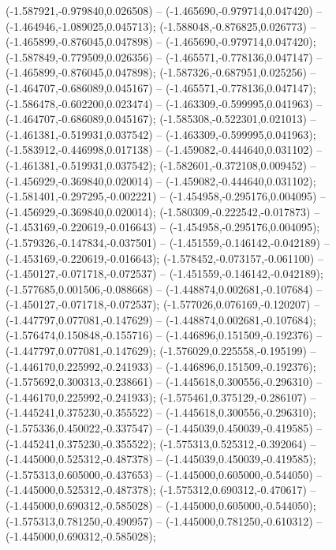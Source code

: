  (-1.587921,-0.979840,0.026508) -- (-1.465690,-0.979714,0.047420) -- (-1.464946,-1.089025,0.045713);
 (-1.588048,-0.876825,0.026773) -- (-1.465899,-0.876045,0.047898) -- (-1.465690,-0.979714,0.047420);
 (-1.587849,-0.779509,0.026356) -- (-1.465571,-0.778136,0.047147) -- (-1.465899,-0.876045,0.047898);
 (-1.587326,-0.687951,0.025256) -- (-1.464707,-0.686089,0.045167) -- (-1.465571,-0.778136,0.047147);
 (-1.586478,-0.602200,0.023474) -- (-1.463309,-0.599995,0.041963) -- (-1.464707,-0.686089,0.045167);
 (-1.585308,-0.522301,0.021013) -- (-1.461381,-0.519931,0.037542) -- (-1.463309,-0.599995,0.041963);
 (-1.583912,-0.446998,0.017138) -- (-1.459082,-0.444640,0.031102) -- (-1.461381,-0.519931,0.037542);
 (-1.582601,-0.372108,0.009452) -- (-1.456929,-0.369840,0.020014) -- (-1.459082,-0.444640,0.031102);
 (-1.581401,-0.297295,-0.002221) -- (-1.454958,-0.295176,0.004095) -- (-1.456929,-0.369840,0.020014);
 (-1.580309,-0.222542,-0.017873) -- (-1.453169,-0.220619,-0.016643) -- (-1.454958,-0.295176,0.004095);
 (-1.579326,-0.147834,-0.037501) -- (-1.451559,-0.146142,-0.042189) -- (-1.453169,-0.220619,-0.016643);
 (-1.578452,-0.073157,-0.061100) -- (-1.450127,-0.071718,-0.072537) -- (-1.451559,-0.146142,-0.042189);
 (-1.577685,0.001506,-0.088668) -- (-1.448874,0.002681,-0.107684) -- (-1.450127,-0.071718,-0.072537);
 (-1.577026,0.076169,-0.120207) -- (-1.447797,0.077081,-0.147629) -- (-1.448874,0.002681,-0.107684);
 (-1.576474,0.150848,-0.155716) -- (-1.446896,0.151509,-0.192376) -- (-1.447797,0.077081,-0.147629);
 (-1.576029,0.225558,-0.195199) -- (-1.446170,0.225992,-0.241933) -- (-1.446896,0.151509,-0.192376);
 (-1.575692,0.300313,-0.238661) -- (-1.445618,0.300556,-0.296310) -- (-1.446170,0.225992,-0.241933);
 (-1.575461,0.375129,-0.286107) -- (-1.445241,0.375230,-0.355522) -- (-1.445618,0.300556,-0.296310);
 (-1.575336,0.450022,-0.337547) -- (-1.445039,0.450039,-0.419585) -- (-1.445241,0.375230,-0.355522);
 (-1.575313,0.525312,-0.392064) -- (-1.445000,0.525312,-0.487378) -- (-1.445039,0.450039,-0.419585);
 (-1.575313,0.605000,-0.437653) -- (-1.445000,0.605000,-0.544050) -- (-1.445000,0.525312,-0.487378);
 (-1.575312,0.690312,-0.470617) -- (-1.445000,0.690312,-0.585028) -- (-1.445000,0.605000,-0.544050);
 (-1.575313,0.781250,-0.490957) -- (-1.445000,0.781250,-0.610312) -- (-1.445000,0.690312,-0.585028);
